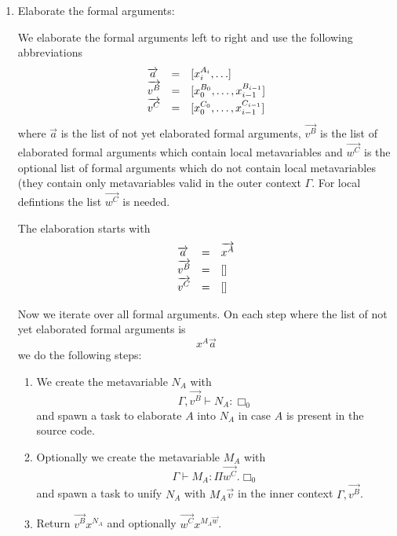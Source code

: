 \begin{enumerate}

    \item Elaborate the formal arguments:

        We elaborate the formal arguments left to right and use the following
        abbreviations
        $$
            \begin{array}{lllll} 
                {\overrightarrow {a}} &=&
                [x_i^{A_i}, \ldots]
                \\
                {\overrightarrow {v^B}} &=& [x_0^{B_0}, \ldots, x_{i-1}^{B_{i-1}}]
                \\
                {\overrightarrow {v^C}} &=& [x_0^{C_0}, \ldots, x_{i-1}^{C_{i-1}}]
             \end{array}
        $$
        where $\vec a$ is the list of not yet elaborated formal arguments,
        $\vec { v^B}$ is the list of elaborated formal arguments which contain
        local metavariables and $\vec {w^C}$ is the optional list of formal
        arguments which do not contain local metavariables (they contain only
        metavariables valid in the outer context $\Gamma$. For local defintions
        the list $\vec {w^C}$ is needed.

        The elaboration starts with
        $$
            \begin{array}{lllll} 
                {\overrightarrow {a}} &=& {\overrightarrow {x^A}}
                \\
                {\overrightarrow {v^B}} &=&  []
                \\
                {\overrightarrow {v^C}} &=&  []
             \end{array}
        $$

        Now we iterate over all formal arguments. On each step where the list of
        not yet elaborated formal arguments is
        $$
            x^A \vec a
        $$
        we do the following steps:

        \begin{enumerate}
            \item We create the metavariable $N_A$ with
                $$
                \Gamma, \vec {v^B} \vdash N_A : \Box_0
                $$
                and spawn a task to elaborate $A$ into $N_A$ in case $A$ is
                present in the source code.

            \item Optionally we create the metavariable $M_A$ with
                $$
                    \Gamma \vdash M_A: \Pi \vec {w^C}. \Box_0
                $$
                and spawn a task to unify $N_A$ with $M_A \vec{v}$ in the inner
                context $\Gamma, \vec{v^B}$.

            \item Return $\vec {v^B} x^{N_A}$ and optionally
                $\vec {w^C} x^{M_A \vec w}$.


\end{enumerate}
\end{enumerate}
